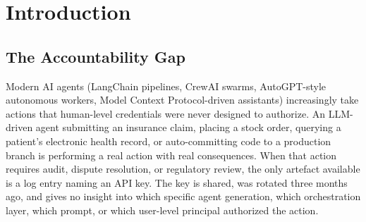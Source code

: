 \documentclass[11pt,a4paper,twocolumn]{article}
\begin{document}
\begin{abstract}
This paper covers the credential format, the Identity Sidecar pattern that isolates an agent's signing key from the LLM process, delegation-chain construction with resource narrowing and depth-limited validation, the BitstringStatusList revocation mechanism, the Heartbeat Protocol's renewal cycle, the dual-proof post-quantum profile and its same-canonical-bytes property, and the State Verifiability runtime. We then work through the adversarial cases that motivated the design (prompt injection, key exfiltration, replay across resources, post-quantum cryptographic obsolescence) and what the protocol does about each. Cross-language test vectors show that three independent implementations produce byte-identical credentials.

The implementation is open-source under Apache 2.0. Sixty defensive prior-art disclosures accompany the specification under CC0 to keep design innovations openly available.

\smallskip
\noindent\textbf{Index Terms:} AI agent identity, Verifiable Credentials, decentralized identifiers, post-quantum cryptography, dual-proof signatures, JCS canonicalization, prompt injection, delegation, continuous attestation, behavioral provenance.
\end{abstract}

\section{Introduction}

\subsection{The Accountability Gap}

Modern AI agents (LangChain pipelines, CrewAI swarms, AutoGPT-style autonomous workers, Model Context Protocol-driven assistants) increasingly take actions that human-level credentials were never designed to authorize. An LLM-driven agent submitting an insurance claim, placing a stock order, querying a patient's electronic health record, or auto-committing code to a production branch is performing a real action with real consequences. When that action requires audit, dispute resolution, or regulatory review, the only artefact available is a log entry naming an API key. The key is shared, was rotated three months ago, and gives no insight into which specific agent generation, which orchestration layer, which prompt, or which user-level principal authorized the action.
\end{document}
